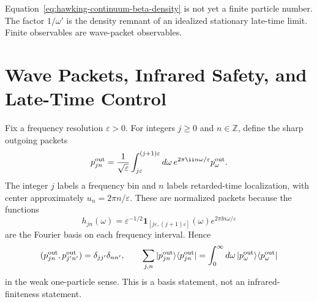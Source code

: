 Equation~\eqref{eq:hawking-continuum-beta-density} is not yet a finite
particle number.  The factor \(1/\omega'\) is the density remnant of an
idealized stationary late-time limit.  Finite observables are wave-packet
observables.

\section{Wave Packets, Infrared Safety, and Late-Time Control}

Fix a frequency resolution \(\varepsilon>0\).  For integers \(j\ge0\) and
\(n\in\mathbb Z\), define the sharp outgoing packets
\begin{equation}
  p_{jn}^{\rm out}
  =
  \frac{1}{\sqrt\varepsilon}
  \int_{j\varepsilon}^{(j+1)\varepsilon}
  d\omega\,
  e^{2\pi\ii n\omega/\varepsilon}p_\omega^{\rm out}.
  \label{eq:hawking-wave-packet-definition}
\end{equation}
The integer \(j\) labels a frequency bin and \(n\) labels retarded-time
localization, with center approximately \(u_n=2\pi n/\varepsilon\).
These are normalized packets because the functions
\[
  h_{jn}(\omega)
  =
  \varepsilon^{-1/2}
  \mathbf 1_{[j\varepsilon,(j+1)\varepsilon]}(\omega)
  e^{2\pi\ii n\omega/\varepsilon}
\]
are the Fourier basis on each frequency interval.  Hence
\[
  (p_{jn}^{\rm out},p_{j'n'}^{\rm out})
  =
  \delta_{jj'}\delta_{nn'},
  \qquad
  \sum_{j,n}|p_{jn}^{\rm out}\rangle\langle p_{jn}^{\rm out}|
  =
  \int_0^\infty d\omega\,
  |p_\omega^{\rm out}\rangle\langle p_\omega^{\rm out}|
\]
in the weak one-particle sense.  This is a basis statement, not an
infrared-finiteness statement.


